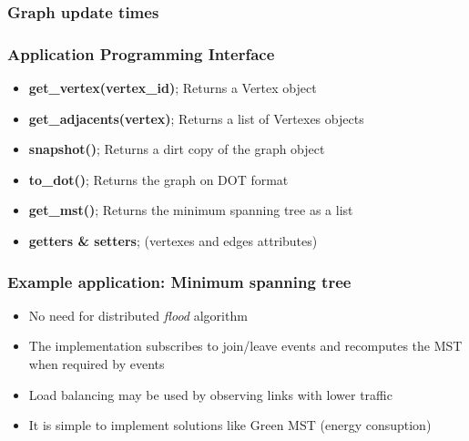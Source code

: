 %
%
\begin{frame}\frametitle{Graph update times}
   
    

    \begin{table}
        \centering
    \caption{Update time of each action}
    \end{table}
\end{frame}


%
%
\begin{frame}\frametitle{Application Programming Interface}

    \begin{itemize}
        \setlength{\itemsep}{10pt}
        \item \textbf{get\_vertex(vertex\_id)}; Returns a Vertex object
        \item \textbf{get\_adjacents(vertex)}; Returns a list of Vertexes objects
        \item \textbf{snapshot()}; Returns a dirt copy of the graph object
        \item \textbf{to\_dot()}; Returns the graph on DOT format
        \item \textbf{get\_mst()}; Returns the minimum spanning tree as a list
        \item \textbf{getters \& setters}; (vertexes and edges attributes)
    \end{itemize}

\end{frame}




%
%
\begin{frame}\frametitle{Example application: Minimum spanning tree}

    \begin{itemize}
        \item No need for distributed \emph{flood} algorithm 
        \item The implementation subscribes to join/leave events and recomputes
            the MST when required by events
        \item Load balancing may be used by observing links with lower traffic
        \item It is simple to implement solutions like Green MST (energy consuption)
    \end{itemize}

\end{frame}
